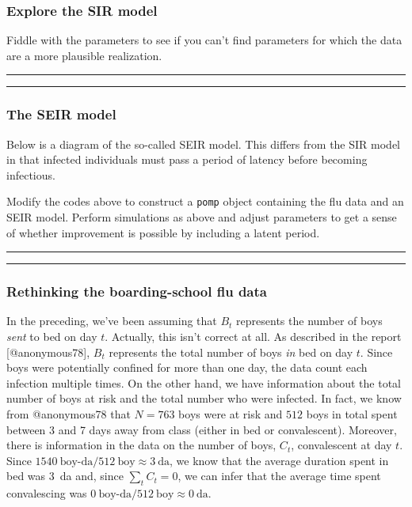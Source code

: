 \documentclass[]{article}
\begin{document}
\subsubsection{Explore the SIR model}\label{explore-the-sir-model}

Fiddle with the parameters to see if you can't find parameters for which
the data are a more plausible realization.

\begin{center}\rule{0.5\linewidth}{\linethickness}\end{center}

\begin{center}\rule{0.5\linewidth}{\linethickness}\end{center}

\subsubsection{The SEIR model}\label{the-seir-model}

Below is a diagram of the so-called SEIR model. This differs from the
SIR model in that infected individuals must pass a period of latency
before becoming infectious.

\hypertarget{htmlwidget-eee77e9722f087b30284}{}

Modify the codes above to construct a \texttt{pomp} object containing
the flu data and an SEIR model. Perform simulations as above and adjust
parameters to get a sense of whether improvement is possible by
including a latent period.

\begin{center}\rule{0.5\linewidth}{\linethickness}\end{center}

\begin{center}\rule{0.5\linewidth}{\linethickness}\end{center}

\subsubsection{Rethinking the boarding-school flu
data}\label{rethinking-the-boarding-school-flu-data}

In the preceding, we've been assuming that \(B_t\) represents the number
of boys \emph{sent} to bed on day \(t\). Actually, this isn't correct at
all. As described in the report {[}@anonymous78{]}, \(B_t\) represents
the total number of boys \emph{in} bed on day \(t\). Since boys were
potentially confined for more than one day, the data count each
infection multiple times. On the other hand, we have information about
the total number of boys at risk and the total number who were infected.
In fact, we know from @anonymous78 that \(N=763\) boys were at risk and
\(512\) boys in total spent between 3 and 7 days away from class (either
in bed or convalescent). Moreover, there is information in the data on
the number of boys, \(C_t\), convalescent at day \(t\). Since
\(1540~\text{boy-da}/512~\text{boy} \approx 3~\text{da}\), we know that
the average duration spent in bed was 3~da and, since \(\sum_t\!C_t=0\),
we can infer that the average time spent convalescing was
\(0~\text{boy-da}/512~\text{boy} \approx 0~\text{da}\).
\end{document}

